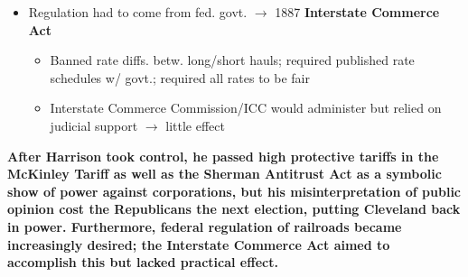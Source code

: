 \documentclass[a4paper]{article}
\begin{document}
{\begin{itemize}
\begin{itemize}
\begin{itemize}
                \end{itemize}
                \item Regulation had to come from fed. govt. $\to$ 1887 \textbf{Interstate Commerce Act} 
                \begin{itemize}
                    \item Banned rate diffs. betw. long/short hauls; required published rate schedules w/ govt.; required all rates to be fair
                    \item Interstate Commerce Commission/ICC would administer but relied on judicial support $\to$ little effect
                \end{itemize}
            \end{itemize}
        \end{itemize}
        \textbf{After Harrison took control, he passed high protective tariffs in the McKinley Tariff as well as the Sherman Antitrust Act as a symbolic show of power against corporations, but his misinterpretation of public opinion cost the Republicans the next election, putting Cleveland back in power. Furthermore, federal regulation of railroads became increasingly desired; the Interstate Commerce Act aimed to accomplish this but lacked practical effect.}}  
    
\end{document}
